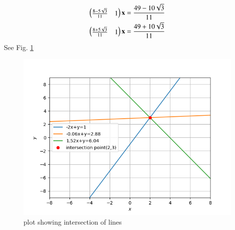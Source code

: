   \begin{align}
  \begin{pmatrix}\frac{8-5\sqrt{3}}{11}&1\end{pmatrix}\mathbf{x}=\frac{49-10\sqrt{3}}{11}\\ 
   \begin{pmatrix}\frac{8+5\sqrt{3}}{11}&1\end{pmatrix}\mathbf{x}=\frac{49+10\sqrt{3}}{11}
  \end{align}
See Fig. \ref{Fig4:solutions/line_plane_40/}
\begin{figure}[!ht]
\centering
\includegraphics[width=\columnwidth]{./solutions/line_plane/40/plot.png}
\caption{plot showing intersection of lines}
\label{Fig4:solutions/line_plane_40/}
\end{figure}
